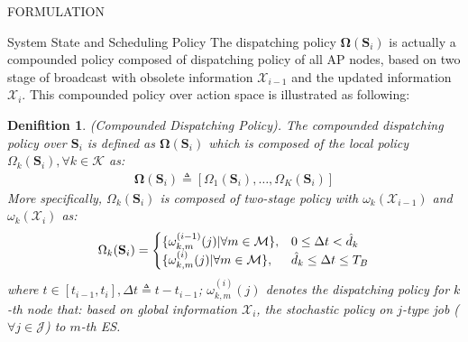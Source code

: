 \documentclass[10pt, conference, letterpaper]{IEEEtran}
\newtheorem{definition}{Denifition}
\newcommand{\define}{\triangleq}
\renewcommand{\vec}{\mathbf}
\DeclarePairedDelimiter{\set}{\{}{\}}
\newcommand{\apSet}{\mathcal{K}}
\newcommand{\esSet}{\mathcal{M}}
\newcommand{\jSet}{\mathcal{J}}
\newcommand{\Stat}{\mathbf{S}}
\newcommand{\Obsv}{\mathcal{X}}
\newcommand{\Policy}{\mathbf{\Omega}}
\begin{document}
\begin{section}{FORMULATION}
\begin{subsection}{System State and Scheduling Policy}
            The dispatching policy $\vec{\Omega}(\Stat_i)$ is actually a compounded policy composed of dispatching policy of all AP nodes, based on two stage of broadcast with obsolete information $\Obsv_{i-1}$ and the updated information $\Obsv_{i}$. This compounded policy over action space is illustrated as following:
            \begin{definition}(Compounded Dispatching Policy).
                The compounded dispatching policy over $\Stat_{i}$ is defined as $\Policy(\Stat_{i})$ which is composed of the local policy $\Omega_k(\Stat_{i}), \forall k\in\apSet$ as:
                \begin{align}
                    \vec{\Omega}(\Stat_{i}) \triangleq [\Omega_1(\Stat_{i}), \dots, \Omega_K(\Stat_{i})]
                \end{align}
                More specifically, $\Omega_k(\Stat_{i})$ is composed of two-stage policy with $\omega_k(\Obsv_{i-1})$ and $\omega_k(\Obsv_{i})$ as:
                \begin{align}
                    \Omega_k(\Stat_i) = 
                    \begin{cases}
                        \set{\omega^{(i-1)}_{k,m}(j)|\forall m\in\esSet}, & 0 \leq \Delta{t} < \hat{d}_k
                        \\
                        \set{\omega^{(i)}_{k,m}(j)|\forall m\in\esSet}, & \hat{d}_k \leq \Delta{t} \leq T_B
                    \end{cases}
                \end{align}
                where $t\in[t_{i-1}, t_{i}], \Delta{t} \define t - t_{i-1}$; $\omega^{(i)}_{k,m}(j)$ denotes the dispatching policy for $k$-th node that: based on global information $\Obsv_{i}$, the stochastic policy on $j$-type job ($\forall j\in\jSet$) to $m$-th ES.
            \end{definition}
        \end{subsection}


\end{section}
\end{document}
